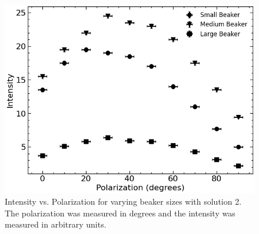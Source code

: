 \begin{figure}[H]
    \begin{center}
        \includegraphics[width=\columnwidth]{../figures/solution2.png}
    \end{center}
    \caption{Intensity vs. Polarization for varying beaker sizes with solution 2. The polarization was measured in degrees and the intensity was measured in arbitrary units.}
    \label{solution2_figure}
\end{figure}

